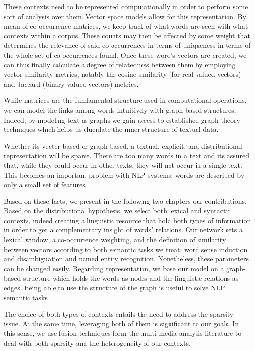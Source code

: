 These contexts need to be represented computationally in order to perform some sort of analysis over them. Vector space models allow for this representation. By mean of co-occurrence matrices, we keep track of what words are seen with what contexts within a corpus. These counts may then be affected by some weight that determines the relevance of said co-occurrences in terms of uniqueness in terms of the whole set of co-occurrences found. Once these word's vectors are created, we can thus finally calculate a degree of relatedness between them by employing vector similarity metrics, notably the cosine similarity (for real-valued vectors) and Jaccard (binary valued vectors) metrics.

While matrices are the fundamental structure used in computational operations, we can model the links among words intuitively with graph-based structures. Indeed, by modeling text as graphs we gain access to  established graph-theory techniques which helps us elucidate the inner structure of textual data. 	

Whether its vector based or graph based, a textual, explicit, and distributional representation will be sparse. There are too many words in a text and its assured that, while they could occur in other texts, they will not occur in a single text. This becomes an important problem with NLP systems: words are described by only a small set of features. 

Based on these facts, we present in the following two chapters our contributions. Based on the distributional hypothesis, we select both lexical and syntactic contexts, indeed creating a linguistic resource that hold both types of information in order to get a complementary insight of words' relations. Our network sets a lexical window, a co-occurrence weighting, and the definition of similarity between vectors according to both semantic tasks we treat: word sense induction and disambiguation and named entity recognition. Nonetheless, these parameters can be changed easily. Regarding representation, we base our model on a graph-based structure which holds the words as nodes and the linguistic relations as edges. Being able to use the structure of the graph is useful to solve NLP semantic tasks \cite{nastase2015survey}.    

The choice of both types of contexts entails the need to address the sparsity issue. At the same time, leveraging both of them is significant to our goals. In this sense, we use fusion techniques form the multi-media analysis literature to deal with both sparsity and the heterogeneity of our contexts.

